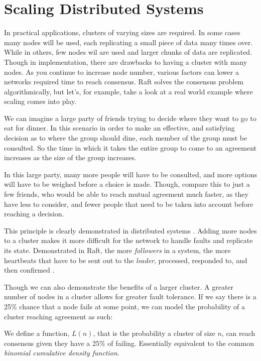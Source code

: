 \section{Scaling Distributed Systems}

In practical applications, clusters of varying sizes are required. In some cases many nodes will be used, each replicating a small piece of data many times over. While in others, few nodes wil are used and larger chunks of data are replicated. Though in implementation, there are drawbacks to having a cluster with many nodes. As you continue to increase node number, various factors can lower a networks required time to reach consensus. Raft solves the consensus problem algorithmically, but let's, for example, take a look at a real world example where scaling comes into play.

We can imagine a large party of friends trying to decide where they want to go to eat for dinner. In this scenario in order to make an effective, and satisfying decision as to where the group should dine, each member of the group must be consulted. So the time in which it takes the entire group to come to an agreement increases as the size of the group increases.

In this large party, many more people will have to be consulted, and more options will have to be weighed before a choice is made. Though, compare this to just a few friends, who would be able to reach mutual agreement much faster, as they have less to consider, and fewer people that need to be taken into account before reaching a decision.

This principle is clearly demonstrated in distributed systems \cite{NeumanScaling}. Adding more nodes to a cluster makes it more difficult for the network to handle faults and replicate its state. Demonstrated in Raft, the more \textit{followers} in a system, the more heartbeats that have to be sent out to the \textit{leader}, processed, responded to, and then confirmed \cite{OngaroRaft}.


Though we can also demonstrate the benefits of a larger cluster. A greater number of nodes in a cluster allows for greater fault tolerance.
If we say there is a 25\% chance that a node fails at some point, we can model the probability of a cluster reaching agreement as such:


We define a function, $L(n)$, that is the probability a cluster of size $n$, can reach consensus given they have a 25\% of failing. Essentially equivalent to the common \textit{binomial cumulative density function}.

